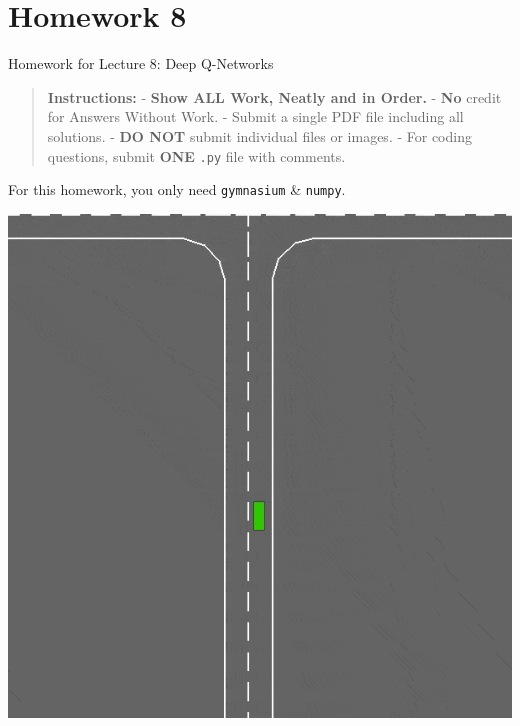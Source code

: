 \documentclass[
  letterpaper,
  DIV=11,
  numbers=noendperiod]{scrreprt}
\makeatletter
\newcommand*\pandocbounded[1]{%
  \sbox\pandoc@box{#1}%
  \Gscale@div\@tempa{\textheight}{\dimexpr\ht\pandoc@box+\dp\pandoc@box\relax}%
  \Gscale@div\@tempb{\linewidth}{\wd\pandoc@box}%
  \ifdim\@tempb\p@<\@tempa\p@\let\@tempa\@tempb\fi%
  \ifdim\@tempa\p@<\p@\scalebox{\@tempa}{\usebox\pandoc@box}%
  \else\usebox{\pandoc@box}%
  \fi%
}
\makeatother
\begin{document}
\section{\texorpdfstring{\href{https://colab.research.google.com/drive/1Y_A4uKoSmjc6EmU-Or7tbeo3fe_ZD4RH?usp=sharing}{\protect\pandocbounded{}}}{}}\label{section-5}

\chapter{Homework 8}\label{homework-8}

\begin{tcolorbox}[enhanced jigsaw, arc=.35mm, toprule=.15mm, leftrule=.75mm, colback=white, left=2mm, colframe=quarto-callout-note-color-frame, rightrule=.15mm, opacityback=0, breakable, bottomrule=.15mm]

Homework for Lecture 8: Deep Q-Networks 📝

\end{tcolorbox}

\begin{quote}
\textbf{Instructions:} - \textbf{Show ALL Work, Neatly and in Order.} -
\textbf{No} credit for Answers Without Work. - Submit a single PDF file
including all solutions. - \textbf{DO NOT} submit individual files or
images. - For coding questions, submit \textbf{ONE} \texttt{.py} file
with comments.
\end{quote}

\begin{tcolorbox}[enhanced jigsaw, toprule=.15mm, leftrule=.75mm, coltitle=black, left=2mm, opacityback=0, titlerule=0mm, arc=.35mm, toptitle=1mm, opacitybacktitle=0.6, bottomtitle=1mm, colframe=quarto-callout-note-color-frame, title=\textcolor{quarto-callout-note-color}{\faInfo}\hspace{0.5em}{Note}, rightrule=.15mm, bottomrule=.15mm, colbacktitle=quarto-callout-note-color!10!white, breakable, colback=white]

For this homework, you only need \texttt{gymnasium} \& \texttt{numpy}.

\end{tcolorbox}

\begin{center}
\includegraphics[width=0.4\linewidth,height=\textheight,keepaspectratio]{homework/images/highway.gif}
\end{center}
\end{document}
